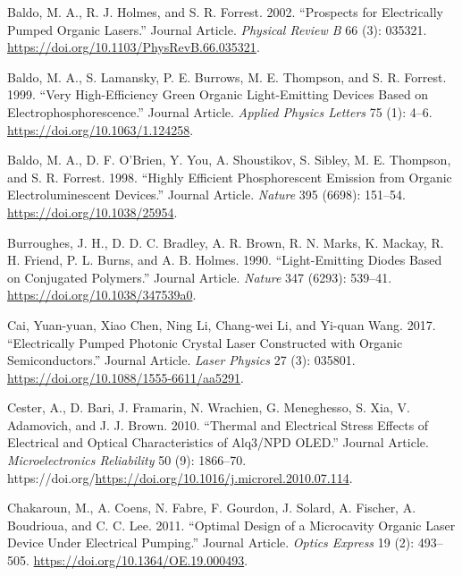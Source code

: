 \documentclass[
  letterpaper,
  DIV=11,
  numbers=noendperiod,
  oneside]{scrreprt}
\newlength{\cslhangindent}
\newlength{\cslentryspacingunit} %
\newenvironment{CSLReferences}[2] %
 {%
  \setlength{\parindent}{0pt}
  \ifodd #1
  \let\oldpar\par
  \def\par{\hangindent=\cslhangindent\oldpar}
  \fi
  \setlength{\parskip}{#2\cslentryspacingunit}
 }%
 {}
\begin{document}
\begin{CSLReferences}{1}{0}
\leavevmode{}%
Baldo, M. A., R. J. Holmes, and S. R. Forrest. 2002. {``Prospects for
Electrically Pumped Organic Lasers.''} Journal Article. \emph{Physical
Review B} 66 (3): 035321.
\url{https://doi.org/10.1103/PhysRevB.66.035321}.

\leavevmode{}%
Baldo, M. A., S. Lamansky, P. E. Burrows, M. E. Thompson, and S. R.
Forrest. 1999. {``Very High-Efficiency Green Organic Light-Emitting
Devices Based on Electrophosphorescence.''} Journal Article.
\emph{Applied Physics Letters} 75 (1): 4--6.
\url{https://doi.org/10.1063/1.124258}.

\leavevmode{}%
Baldo, M. A., D. F. O'Brien, Y. You, A. Shoustikov, S. Sibley, M. E.
Thompson, and S. R. Forrest. 1998. {``Highly Efficient Phosphorescent
Emission from Organic Electroluminescent Devices.''} Journal Article.
\emph{Nature} 395 (6698): 151--54. \url{https://doi.org/10.1038/25954}.

\leavevmode{}%
Burroughes, J. H., D. D. C. Bradley, A. R. Brown, R. N. Marks, K.
Mackay, R. H. Friend, P. L. Burns, and A. B. Holmes. 1990.
{``Light-Emitting Diodes Based on Conjugated Polymers.''} Journal
Article. \emph{Nature} 347 (6293): 539--41.
\url{https://doi.org/10.1038/347539a0}.

\leavevmode{}%
Cai, Yuan-yuan, Xiao Chen, Ning Li, Chang-wei Li, and Yi-quan Wang.
2017. {``Electrically Pumped Photonic Crystal Laser Constructed with
Organic Semiconductors.''} Journal Article. \emph{Laser Physics} 27 (3):
035801. \url{https://doi.org/10.1088/1555-6611/aa5291}.

\leavevmode{}%
Cester, A., D. Bari, J. Framarin, N. Wrachien, G. Meneghesso, S. Xia, V.
Adamovich, and J. J. Brown. 2010. {``Thermal and Electrical Stress
Effects of Electrical and Optical Characteristics of Alq3/NPD OLED.''}
Journal Article. \emph{Microelectronics Reliability} 50 (9): 1866--70.
https://doi.org/\url{https://doi.org/10.1016/j.microrel.2010.07.114}.

\leavevmode{}%
Chakaroun, M., A. Coens, N. Fabre, F. Gourdon, J. Solard, A. Fischer, A.
Boudrioua, and C. C. Lee. 2011. {``Optimal Design of a Microcavity
Organic Laser Device Under Electrical Pumping.''} Journal Article.
\emph{Optics Express} 19 (2): 493--505.
\url{https://doi.org/10.1364/OE.19.000493}.


\end{CSLReferences}
\end{document}
